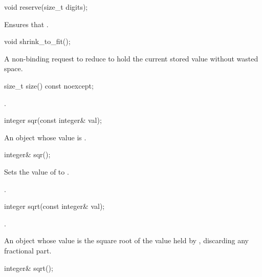 \begin{itemdecl}
void reserve(size_t digits);	
\end{itemdecl}

\begin{itemdescr}
\effects Ensures that .		
\end{itemdescr}

\begin{itemdecl}
void shrink_to_fit();	
\end{itemdecl}

\begin{itemdescr}	
\effects A non-binding request to reduce  to hold the current stored value without wasted space.	
\end{itemdescr}

\begin{itemdecl}
size_t size() const noexcept;	
\end{itemdecl}

\begin{itemdescr}
\returns {}.		
\end{itemdescr}

\begin{itemdecl}
integer sqr(const integer& val);	
\end{itemdecl}

\begin{itemdescr}
\returns An object whose value is .		
\end{itemdescr}

\begin{itemdecl}
integer& sqr();	
\end{itemdecl}

\begin{itemdescr}
\effects Sets the value of  to .

\returns {}.		
\end{itemdescr}

\begin{itemdecl}
integer sqrt(const integer& val);	
\end{itemdecl}

\begin{itemdescr}
\requires {}.	
	
\returns An object whose value is the square root of the value held by , discarding any fractional part. 		
\end{itemdescr}

\begin{itemdecl}
integer& sqrt();	
\end{itemdecl}

